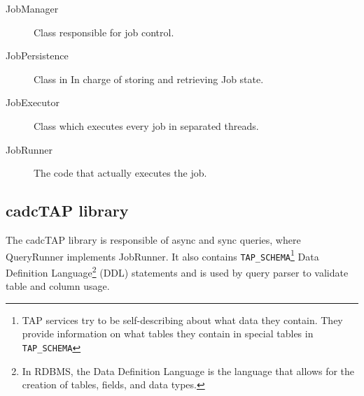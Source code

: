 \begin{description}

\item[JobManager] Class responsible for job control.

\item[JobPersistence] Class in In charge of storing and retrieving Job state.

\item[JobExecutor] Class which executes every job in separated threads.

\item[JobRunner] The code that actually executes the job.

\end{description}


\subsection{cadcTAP library} %
\label{sub:cadctap_library}

The cadcTAP library is responsible of async and sync queries, where QueryRunner implements JobRunner. It also contains \texttt{TAP\_SCHEMA}\footnote{TAP services try to be self-describing about what data they contain. They provide information on what tables they contain in special tables in \texttt{TAP\_SCHEMA}}
Data Definition Language\footnote{In RDBMS, the Data Definition Language is the language that allows for the creation of tables, fields, and data types.} (DDL) %
statements and is used by query parser to validate table and column usage.

